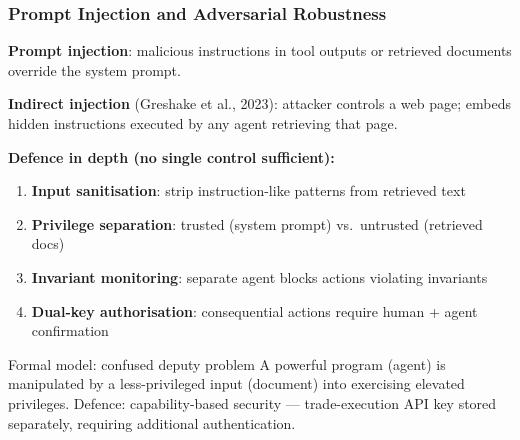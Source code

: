 \documentclass[9pt,t]{beamer}
\begin{document}
\begin{frame}
\frametitle{Prompt Injection and Adversarial Robustness}

\textbf{Prompt injection}: malicious instructions in tool outputs or retrieved documents
override the system prompt.

\medskip
\textbf{Indirect injection} (Greshake et al., 2023): attacker controls a web page;
embeds hidden instructions executed by any agent retrieving that page.

\medskip
\textbf{Defence in depth (no single control sufficient):}
\begin{enumerate}
  \item \textbf{Input sanitisation}: strip instruction-like patterns from retrieved text
  \item \textbf{Privilege separation}: trusted (system prompt) vs.\ untrusted (retrieved docs)
  \item \textbf{Invariant monitoring}: separate agent blocks actions violating invariants
  \item \textbf{Dual-key authorisation}: consequential actions require human + agent confirmation
\end{enumerate}

\medskip
\begin{block}{Formal model: confused deputy problem}
A powerful program (agent) is manipulated by a less-privileged input (document)
into exercising elevated privileges. Defence: capability-based security ---
trade-execution API key stored separately, requiring additional authentication.
\end{block}
\end{frame}
\end{document}
